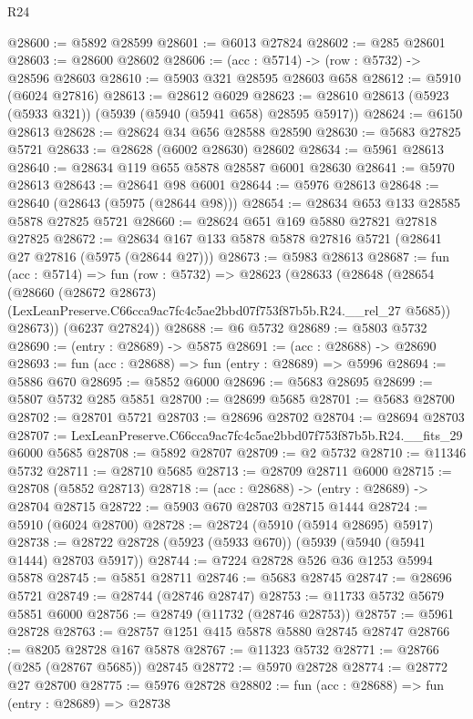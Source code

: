 \begin{lexlean}{R24}
\begin{coremodule}
@28600 := @5892 @28599
@28601 := @6013 @27824
@28602 := @285 @28601
@28603 := @28600 @28602
@28606 := (acc : @5714) -> (row : @5732) -> @28596 @28603
@28610 := @5903 @321 @28595 @28603 @658
@28612 := @5910 (@6024 @27816)
@28613 := @28612 @6029
@28623 := @28610 @28613 (@5923 (@5933 @321)) (@5939 (@5940 (@5941 @658) @28595 @5917))
@28624 := @6150 @28613
@28628 := @28624 @34 @656 @28588 @28590
@28630 := @5683 @27825 @5721
@28633 := @28628 (@6002 @28630) @28602
@28634 := @5961 @28613
@28640 := @28634 @119 @655 @5878 @28587 @6001 @28630
@28641 := @5970 @28613
@28643 := @28641 @98 @6001
@28644 := @5976 @28613
@28648 := @28640 (@28643 (@5975 (@28644 @98)))
@28654 := @28634 @653 @133 @28585 @5878 @27825 @5721
@28660 := @28624 @651 @169 @5880 @27821 @27818 @27825
@28672 := @28634 @167 @133 @5878 @5878 @27816 @5721 (@28641 @27 @27816 (@5975 (@28644 @27)))
@28673 := @5983 @28613
@28687 := fun (acc : @5714) =>
  fun (row : @5732) =>
  @28623
    (@28633
      (@28648
        (@28654
          (@28660
            (@28672 @28673)
            (LexLeanPreserve.C66cca9ac7fc4c5ae2bbd07f753f87b5b.R24.__rel_27 @5685))
          @28673))
      (@6237 @27824))
@28688 := @6 @5732
@28689 := @5803 @5732
@28690 := (entry : @28689) -> @5875
@28691 := (acc : @28688) -> @28690
@28693 := fun (acc : @28688) => fun (entry : @28689) => @5996
@28694 := @5886 @670
@28695 := @5852 @6000
@28696 := @5683 @28695
@28699 := @5807 @5732 @285 @5851
@28700 := @28699 @5685
@28701 := @5683 @28700
@28702 := @28701 @5721
@28703 := @28696 @28702
@28704 := @28694 @28703
@28707 := LexLeanPreserve.C66cca9ac7fc4c5ae2bbd07f753f87b5b.R24.__fits_29 @6000 @5685
@28708 := @5892 @28707
@28709 := @2 @5732
@28710 := @11346 @5732
@28711 := @28710 @5685
@28713 := @28709 @28711 @6000
@28715 := @28708 (@5852 @28713)
@28718 := (acc : @28688) -> (entry : @28689) -> @28704 @28715
@28722 := @5903 @670 @28703 @28715 @1444
@28724 := @5910 (@6024 @28700)
@28728 := @28724 (@5910 (@5914 @28695) @5917)
@28738 := @28722 @28728 (@5923 (@5933 @670)) (@5939 (@5940 (@5941 @1444) @28703 @5917))
@28744 := @7224 @28728 @526 @36 @1253 @5994 @5878
@28745 := @5851 @28711
@28746 := @5683 @28745
@28747 := @28696 @5721
@28749 := @28744 (@28746 @28747)
@28753 := @11733 @5732 @5679 @5851 @6000
@28756 := @28749 (@11732 (@28746 @28753))
@28757 := @5961 @28728
@28763 := @28757 @1251 @415 @5878 @5880 @28745 @28747
@28766 := @8205 @28728 @167 @5878
@28767 := @11323 @5732
@28771 := @28766 (@285 (@28767 @5685)) @28745
@28772 := @5970 @28728
@28774 := @28772 @27 @28700
@28775 := @5976 @28728
@28802 := fun (acc : @28688) =>
  fun (entry : @28689) =>
  @28738

\end{coremodule}
\end{lexlean}
